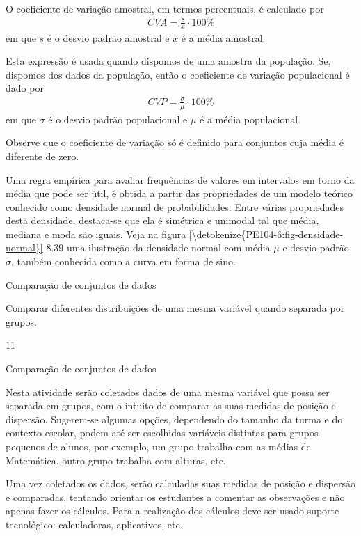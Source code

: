 {{{O coeficiente de variação amostral, em termos percentuais, é calculado  por
\begin{equation*}
\begin{split}CVA=\frac{s}{\bar{x}}\cdot 100 \%\end{split}
\end{equation*}
em que \(s\) é o desvio padrão amostral e \(\bar{x}\) é a média amostral.

Esta expressão é usada quando dispomos de uma amostra da população. Se, dispomos dos dados da população, então o coeficiente de variação populacional é dado por
\begin{equation*}
\begin{split}CVP=\frac{{\sigma}}{\mu}\cdot 100\%\end{split}
\end{equation*}
em que \(\sigma\) é o desvio padrão populacional e \(\mu\) é a média populacional.

Observe que o coeficiente de variação só é definido para conjuntos cuja média é diferente de zero.

Uma regra empírica para avaliar frequências de valores em intervalos em torno da média que pode ser útil, é obtida a partir das propriedades de um modelo teórico conhecido como densidade normal de probabilidades. Entre várias propriedades desta densidade, destaca-se que ela é simétrica e unimodal tal que média, mediana e moda são iguais. Veja na \hyperref[\detokenize{PE104-6:fig-densidade-normal}]{figura \ref{\detokenize{PE104-6:fig-densidade-normal}}} 8.39 uma ilustração da densidade normal com média \(\mu\) e desvio padrão \(\sigma\), também conhecida como a curva em forma de sino.
\clearpage
{\def\currentcolor{session2}
\begin{objectives}{Comparação de conjuntos de dados}
{
Comparar diferentes distribuições de uma mesma variável quando separada por grupos.


}{1}{1}
\end{objectives}
\begin{sugestions}{Comparação de conjuntos de dados}
{
Nesta atividade serão coletados dados de uma mesma variável que possa ser separada em grupos, com o intuito de comparar as suas medidas de posição e dispersão. Sugerem-se algumas opções, dependendo do tamanho da turma e do contexto escolar, podem até ser escolhidas variáveis distintas para grupos pequenos de alunos, por exemplo, um grupo trabalha com as médias de Matemática, outro grupo trabalha com alturas, etc.

Uma vez coletados os dados, serão calculadas suas medidas de posição e dispersão e comparadas, tentando orientar os estudantes a comentar as observações e não apenas fazer os cálculos. Para a realização dos cálculos deve ser usado suporte tecnológico: calculadoras, aplicativos, etc.

}
\end{sugestions}}}}}
